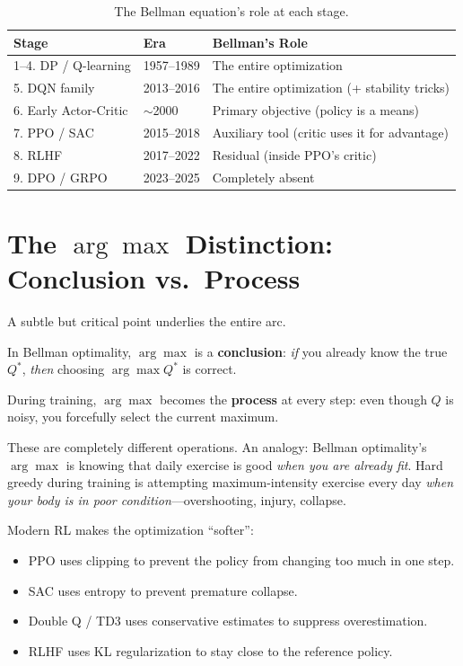 \begin{table}[ht]
\centering
\caption{The Bellman equation's role at each stage.}
\label{tab:bellman-role}
\begin{tabular}{lll}
\toprule
\textbf{Stage} & \textbf{Era} & \textbf{Bellman's Role} \\
\midrule
1--4. DP / Q-learning       & 1957--1989 & The entire optimization \\
5. DQN family               & 2013--2016 & The entire optimization (+ stability tricks) \\
6. Early Actor-Critic       & $\sim$2000 & Primary objective (policy is a means) \\
7. PPO / SAC                & 2015--2018 & Auxiliary tool (critic uses it for advantage) \\
8. RLHF                     & 2017--2022 & Residual (inside PPO's critic) \\
9. DPO / GRPO               & 2023--2025 & Completely absent \\
\bottomrule
\end{tabular}
\end{table}

\section{The $\arg\max$ Distinction: Conclusion vs.\ Process}
\label{sec:argmax-distinction}

A subtle but critical point underlies the entire arc.

In Bellman optimality, $\arg\max$ is a \textbf{conclusion}:
\emph{if} you already know the true $Q^{\ast}$, \emph{then} choosing $\arg\max Q^{\ast}$ is correct.

During training, $\arg\max$ becomes the \textbf{process} at every step:
even though $Q$ is noisy, you forcefully select the current maximum.

These are completely different operations.
An analogy: Bellman optimality's $\arg\max$ is knowing that daily exercise is good \emph{when you are already fit}.
Hard greedy during training is attempting maximum-intensity exercise every day \emph{when your body is in poor condition}---overshooting, injury, collapse.

Modern RL makes the optimization ``softer'':
\begin{itemize}
    \item PPO uses clipping to prevent the policy from changing too much in one step.
    \item SAC uses entropy to prevent premature collapse.
    \item Double Q / TD3 uses conservative estimates to suppress overestimation.
    \item RLHF uses KL regularization to stay close to the reference policy.
\end{itemize}

